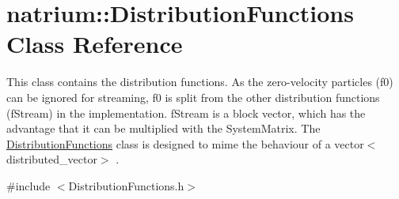 \hypertarget{classnatrium_1_1DistributionFunctions}{\section{natrium\-:\-:Distribution\-Functions Class Reference}
\label{classnatrium_1_1DistributionFunctions}
}


This class contains the distribution functions. As the zero-\/velocity particles (f0) can be ignored for streaming, f0 is split from the other distribution functions (f\-Stream) in the implementation. f\-Stream is a block vector, which has the advantage that it can be multiplied with the System\-Matrix. The \hyperlink{classnatrium_1_1DistributionFunctions}{Distribution\-Functions} class is designed to mime the behaviour of a vector$<$distributed\-\_\-vector$>$ .  




{\ttfamily \#include $<$Distribution\-Functions.\-h$>$}

